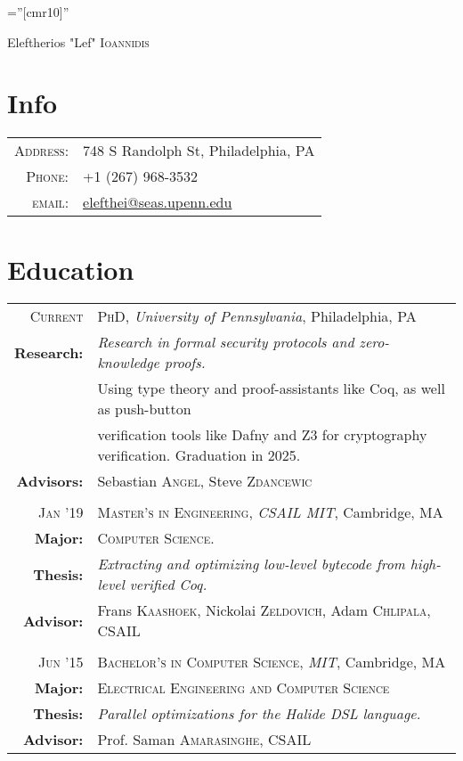\documentclass[lettersize,11pt]{article}
\begin{document}
\pagestyle{empty} %
\font\fb=''[cmr10]'' %

\par{\centering
		{\Huge Eleftherios "Lef" \textsc{Ioannidis}
	}
	\bigskip\par}

\section{Info}

\begin{tabular}{rl}
    \textsc{Address:}   & 748 S Randolph St, Philadelphia, PA \\
    \textsc{Phone:}     & +1 (267) 968-3532 \\
    \textsc{email:}     & \href{mailto:elefthei@seas.upenn.edu}{elefthei@seas.upenn.edu}
\end{tabular}

\section{Education}
\begin{tabular}{rl}
\textsc{Current} & \textsc{PhD}, \emph{University of Pennsylvania}, Philadelphia, PA\\
\textbf{Research:} & \emph{Research in formal security protocols and zero-knowledge proofs.}\\
& Using type theory and proof-assistants like Coq, as well as push-button \\
& verification tools like Dafny and Z3 for cryptography verification. Graduation in 2025. \\
\textbf{Advisors:} & Sebastian \textsc{Angel}, Steve \textsc{Zdancewic}\\
& \\
\textsc{Jan} '19 & \textsc{Master's in Engineering}, \emph{CSAIL MIT}, Cambridge, MA\\
\textbf{Major:} & \textsc{Computer Science.}\\
\textbf{Thesis:} & \emph{Extracting and optimizing low-level bytecode from high-level verified Coq.}\\
\textbf{Advisor:} & Frans \textsc{Kaashoek}, Nickolai \textsc{Zeldovich}, Adam \textsc{Chlipala},  CSAIL\\
 & \\
\textsc{Jun} '15 & \textsc{Bachelor's in Computer Science}, \emph{MIT}, Cambridge, MA\\
\textbf{Major:} & \textsc{Electrical Engineering and Computer Science}\\
\textbf{Thesis:} & \emph{Parallel optimizations for the Halide DSL language.}\\
\textbf{Advisor:} & Prof. Saman \textsc{Amarasinghe}, CSAIL\\
\end{tabular}
\end{document}
